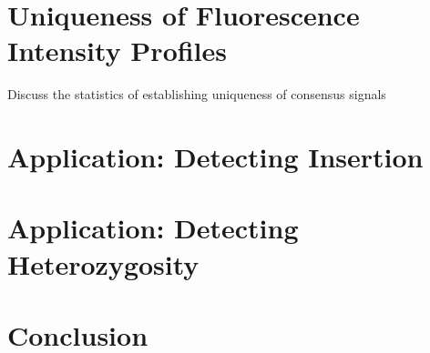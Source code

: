 \documentclass[11pt]{extarticle} %
\begin{document}
\section*{Uniqueness of Fluorescence Intensity Profiles}
Discuss the statistics of establishing uniqueness of consensus signals

\section*{Application: Detecting Insertion}

\section*{Application: Detecting Heterozygosity}

\section*{Conclusion}

\newpage

%
\end{document}
